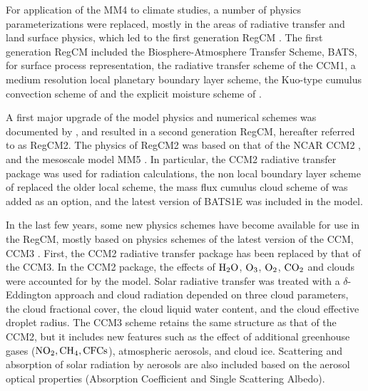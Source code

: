 For application of the \ac{MM4} to climate studies, a number of physics
parameterizations were replaced, mostly in the areas of radiative transfer and
land surface physics, which led to the first generation \ac{RegCM}
\citep{Dickinson_89,Giorgi_90}. The first generation \ac{RegCM} included the
Biosphere-Atmosphere Transfer Scheme, BATS, \citep{Dickinson_86} for surface
process representation, the radiative transfer scheme of the \ac{CCM1}, a medium
resolution local planetary boundary layer scheme, the Kuo-type cumulus
convection scheme of \citep{Anthes_77} and the explicit moisture scheme of
\citep{Hsie_84}.

A first major upgrade of the model physics and numerical schemes was documented
by \citep{Giorgi_93,Giorgi_93b}, and resulted in a second generation \ac{RegCM},
hereafter referred to as \ac{RegCM2}. The physics of \ac{RegCM2} was based on
that of the \ac{NCAR} \ac{CCM2} \citep{Hack_93}, and the mesoscale model
\ac{MM5} \citep{Grell_94}. In particular, the \ac{CCM2} radiative transfer
package \citep{Briegleb_92} was used for radiation calculations, the non local
boundary layer scheme of \citep{Holtslag_90} replaced the older local scheme,
the mass flux cumulus cloud scheme of \citep{Grell_93} was added as an option,
and the latest version of BATS1E \citep{Dickinson_93} was included in the model.

In the last few years, some new physics schemes have become available for use in
the \ac{RegCM}, mostly based on physics schemes of the latest version of the
\ac{CCM}, \ac{CCM3} \citep{Kiehl_96}. First, the \ac{CCM2} radiative transfer
package has been replaced by that of the \ac{CCM3}. In the \ac{CCM2} package,
the effects of ${\rm H_2O}$, ${\rm O_3}$, ${\rm O_2}$, ${\rm CO_2}$ and clouds
were accounted for by the model. Solar radiative transfer was treated with a
$\delta$-Eddington approach and cloud radiation depended on three cloud
parameters, the cloud fractional cover, the cloud liquid water content, and the
cloud effective droplet radius. The \ac{CCM3} scheme retains the same structure
as that of the \ac{CCM2}, but it includes new features such as the effect of
additional greenhouse gases (${\rm NO_2, CH_4, CFCs}$), atmospheric aerosols,
and cloud ice. Scattering and absorption of solar radiation by aerosols are
also included based on the aerosol optical properties (Absorption Coefficient
and Single Scattering Albedo).
 
